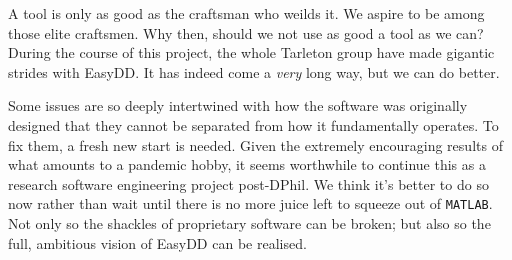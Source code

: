 A tool is only as good as the craftsman who weilds it. We aspire to be among those elite craftsmen. Why then, should we not use as good a tool as we can? During the course of this project, the whole Tarleton group have made gigantic strides with EasyDD. It has indeed come a \emph{very} long way, but we can do better.

Some issues are so deeply intertwined with how the software was originally designed that they cannot be separated from how it fundamentally operates. To fix them, a fresh new start is needed. Given the extremely encouraging results of what amounts to a pandemic hobby, it seems worthwhile to continue this as a research software engineering project post-DPhil. We think it's better to do so now rather than wait until there is no more juice left to squeeze out of \texttt{MATLAB}. Not only so the shackles of proprietary software can be broken; but also so the full, ambitious vision of EasyDD can be realised.
\savearabiccounter
